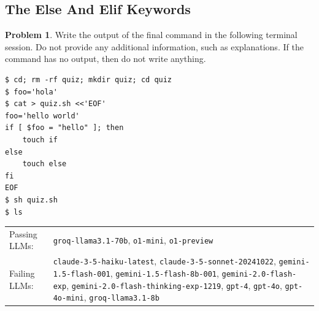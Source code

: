 \documentclass[10pt]{article}
\theoremstyle{definition}
\newtheorem{problem}{Problem}
\begin{document}
\noindent\vspace{0.1in}\begin{minipage}{\textwidth}
\subsection{The Else And Elif Keywords}

\begin{problem}
Write the output of the final command in the following terminal session.
Do not provide any additional information,
such as explanations.
If the command has no output,
then do not write anything.

\end{problem}
\begin{lstlisting}
$ cd; rm -rf quiz; mkdir quiz; cd quiz
$ foo='hola'
$ cat > quiz.sh <<'EOF'
foo='hello world'
if [ $foo = "hello" ]; then
    touch if
else
    touch else
fi
EOF
$ sh quiz.sh
$ ls
\end{lstlisting}


\noindent
\begin{tabular}{p{1.0in}L{5in}}
Passing LLMs: & {\lstinline$groq-llama3.1-70b$}, {\lstinline$o1-mini$}, {\lstinline$o1-preview$} \\
Failing LLMs: & {\lstinline$claude-3-5-haiku-latest$}, {\lstinline$claude-3-5-sonnet-20241022$}, {\lstinline$gemini-1.5-flash-001$}, {\lstinline$gemini-1.5-flash-8b-001$}, {\lstinline$gemini-2.0-flash-exp$}, {\lstinline$gemini-2.0-flash-thinking-exp-1219$}, {\lstinline$gpt-4$}, {\lstinline$gpt-4o$}, {\lstinline$gpt-4o-mini$}, {\lstinline$groq-llama3.1-8b$} \\
\end{tabular}

\end{minipage}
\end{document}
